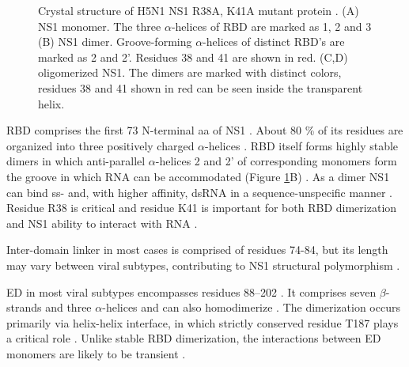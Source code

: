 		\begin{figure}[h!]
			\centering
			\caption{Crystal structure of H5N1 NS1 R38A, K41A mutant protein \parencite{Bornholdt2008}. (A) NS1 monomer. The three $\alpha$-helices of RBD are marked as 1, 2 and 3 (B) NS1 dimer. Groove-forming $\alpha$-helices of distinct RBD's are marked as 2 and 2'. Residues 38 and 41 are shown in red. (C,D) oligomerized NS1. The dimers are marked with distinct colors, residues 38 and 41 shown in red can be seen inside the transparent helix. } \label{fig:structure}
		\end{figure}
		
		\gls{RBD} comprises the first 73 N-terminal aa of \gls{NS1} \parencite{Qian1995a, Yin2007a}. About 80 \% of its residues are organized into three positively charged $\alpha$-helices \parencite{Qian1995a, Liu1997}. \gls{RBD} itself forms highly stable dimers in which anti-parallel $\alpha$-helices 2 and 2' of corresponding monomers form the groove in which RNA can be accommodated (Figure \ref{fig:structure}B) \parencite{Chien1997, Wang1999}. As a dimer NS1 can bind ss- and, with higher affinity, dsRNA in a sequence-unspecific manner \parencite{Hatada1992, Chien1997, Qian1995}. Residue R38 is critical and residue K41 is important for both \gls{RBD} dimerization and \gls{NS1} ability to interact with RNA \parencite{Hatada1992, Wang1999}.
		
		Inter-domain linker in most cases is comprised of residues 74-84, but its length may vary between viral subtypes, contributing to \gls{NS1} structural polymorphism \parencite{Bornholdt2006, Carrillo2014, Kerry2011}.
		
		\gls{ED} in most viral subtypes encompasses residues 88--202 \parencite{Hale2014}. It comprises seven $\beta$-strands and three $\alpha$-helices and can also homodimerize \parencite{Bornholdt2006, Hale2008c, Xia2009}. The dimerization occurs primarily via helix-helix interface, in which strictly conserved residue T187 plays a critical role \parencite{Hale2008c, Kerry2011}. Unlike stable \gls{RBD} dimerization, the interactions between \gls{ED} monomers are likely to be transient \parencite{Kerry2011, Hale2014}.
		
